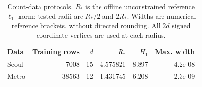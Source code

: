 \begin{table}[htbp]
\centering\small
\caption{Count-data protocols. $R_*$ is the offline unconstrained reference $\ell_1$ norm; tested radii are $R_*/2$ and $2R_*$. Widths are numerical reference brackets, without directed rounding. All $2d$ signed coordinate vertices are used at each radius.}
\label{tab:data}
\begin{tabular}{lrrrrr}
\toprule
Data & Training rows & $d$ & $R_*$ & $H_1$ & Max. width \\
\midrule
Seoul & 7008 & 15 & 4.575821 & 8.897 & 4.2e-08 \\
Metro & 38563 & 12 & 1.431745 & 6.208 & 2.3e-09 \\
\bottomrule
\end{tabular}
\end{table}
